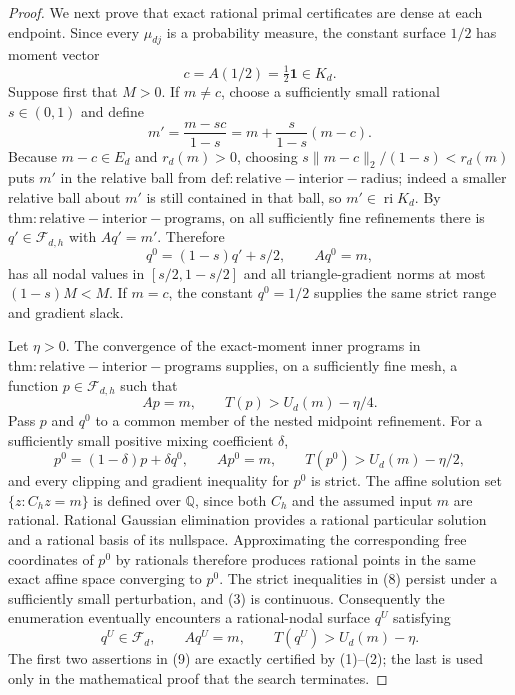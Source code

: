 \documentclass{article}
\begin{document}
\begin{proof}
We next prove that exact rational primal certificates are dense at each
endpoint.  Since every \(\mu_{dj}\) is a probability measure, the constant
surface \(1/2\) has moment vector
\[
 c=A(1/2)=\tfrac12\mathbf 1\in K_d.                         \tag{4}
\]
Suppose first that \(M>0\).  If \(m\neq c\), choose a sufficiently small
rational \(s\in(0,1)\) and define
\[
 m'=\frac{m-sc}{1-s}
    =m+\frac{s}{1-s}(m-c).                                  \tag{5}
\]
Because \(m-c\in E_d\) and \(r_d(m)>0\), choosing
\(s\|m-c\|_2/(1-s)<r_d(m)\) puts \(m'\) in the relative ball from
\(\mathrm{def:relative-interior-radius}\); indeed a smaller relative ball
about \(m'\) is still contained in that ball, so \(m'\in\operatorname{ri}K_d\).
By \(\mathrm{thm:relative-interior-programs}\), on all sufficiently fine
refinements there is \(q'\in\mathcal F_{d,h}\) with \(Aq'=m'\).  Therefore
\[
 q^0=(1-s)q'+s/2,
 \qquad Aq^0=m,                                              \tag{6}
\]
has all nodal values in \([s/2,1-s/2]\) and all triangle-gradient norms at
most \((1-s)M<M\).  If \(m=c\), the constant \(q^0=1/2\) supplies the same
strict range and gradient slack.

Let \(\eta>0\).  The convergence of the exact-moment inner programs in
\(\mathrm{thm:relative-interior-programs}\) supplies, on a sufficiently fine
mesh, a function \(p\in\mathcal F_{d,h}\) such that
\[
 Ap=m,
 \qquad T(p)>U_d(m)-\eta/4.                                 \tag{7}
\]
Pass \(p\) and \(q^0\) to a common member of the nested midpoint refinement.
For a sufficiently small positive mixing coefficient \(\delta\),
\[
 p^0=(1-\delta)p+\delta q^0,
 \qquad Ap^0=m,
 \qquad T(p^0)>U_d(m)-\eta/2,                               \tag{8}
\]
and every clipping and gradient inequality for \(p^0\) is strict.  The affine
solution set \(\{z:C_hz=m\}\) is defined over \(\mathbb Q\), since both
\(C_h\) and the assumed input \(m\) are rational.  Rational Gaussian
elimination provides a rational particular solution and a rational basis of
its nullspace.  Approximating the corresponding free coordinates of \(p^0\)
by rationals therefore produces rational points in the same exact affine
space converging to \(p^0\).  The strict inequalities in (8) persist under a
sufficiently small perturbation, and (3) is continuous.  Consequently the
enumeration eventually encounters a rational-nodal surface \(q^U\) satisfying
\[
 q^U\in\mathcal F_d,
 \qquad Aq^U=m,
 \qquad T(q^U)>U_d(m)-\eta.                                 \tag{9}
\]
The first two assertions in (9) are exactly certified by (1)--(2); the last is
used only in the mathematical proof that the search terminates.


\end{proof}
\end{document}
